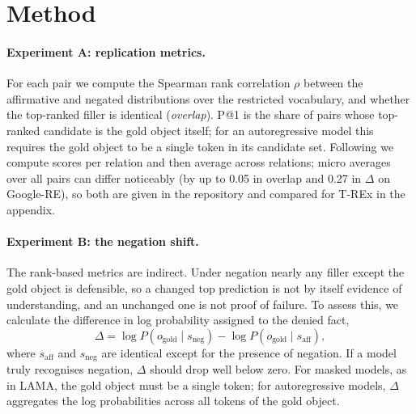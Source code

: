 \documentclass{article}
\begin{document}
\section{Method}
\label{sec:method}

\paragraph{Experiment A: replication metrics.} For each pair we compute the Spearman rank correlation
$\rho$ between the affirmative and negated distributions over the restricted vocabulary, and whether
the top-ranked filler is identical (\emph{overlap}). P@1 is the share of pairs whose top-ranked candidate is the gold object itself; for an autoregressive model this requires the gold object to be a single token in its candidate set. Following \citet{petroni2019} we compute scores per relation and then average across relations; micro averages over all pairs can differ noticeably (by up to 0.05 in overlap and 0.27 in $\Delta$ on Google-RE), so both are given in the repository and compared for T-REx in the appendix.

\paragraph{Experiment B: the negation shift.} The rank-based metrics are indirect. Under negation
nearly any filler except the gold object is defensible, so a changed top prediction is not by itself
evidence of understanding, and an unchanged one is not proof of failure. To assess this, we calculate the difference in log probability assigned to the denied fact,
\begin{equation}
\Delta = \log P(o_{\text{gold}} \mid s_{\text{neg}}) - \log P(o_{\text{gold}} \mid s_{\text{aff}}),
\label{eq:delta}
\end{equation}
where $s_{\text{aff}}$ and $s_{\text{neg}}$ are identical except for the presence of negation. If a model truly recognises negation, $\Delta$ should drop well below zero. For masked models, as in LAMA, the gold object must be a single token; for autoregressive models, $\Delta$ aggregates the log probabilities across all tokens of the gold object.
\end{document}
